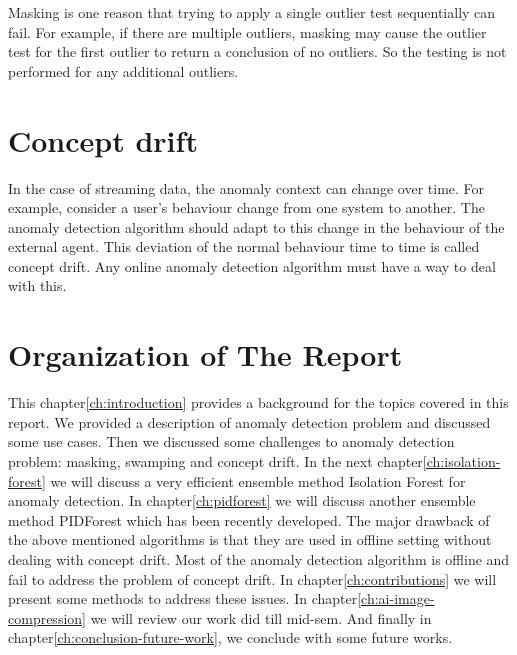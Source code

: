 Masking is one reason that trying to apply a single outlier test sequentially can fail.
For example, if there are multiple outliers, masking may cause the outlier test for the first outlier to return a conclusion of no outliers.
So the testing is not performed for any additional outliers.

\section{Concept drift}
\label{sec:concept-drift-definition}

In the case of streaming data, the anomaly context can change over time.
For example, consider a user's behaviour change from one system to another.
The anomaly detection algorithm should adapt to this change in the behaviour of the external agent.
This deviation of the normal behaviour time to time is called concept drift.
Any online anomaly detection algorithm must have a way to deal with this.


\section{Organization of The Report}
\label{sec:organization-of-the-report}

This chapter\ref{ch:introduction} provides a background for the topics covered in this report.
We provided a description of anomaly detection problem and discussed some use cases.
Then we discussed some challenges to anomaly detection problem: masking, swamping and concept drift.
In the next chapter\ref{ch:isolation-forest} we will discuss a very efficient ensemble method Isolation Forest for anomaly detection.
In chapter\ref{ch:pidforest} we will discuss another ensemble method PIDForest which has been recently developed.
The major drawback of the above mentioned algorithms is that they are used in offline setting without dealing with concept drift.
Most of the anomaly detection algorithm is offline and fail to address the problem of concept drift.
In chapter\ref{ch:contributions} we will present some methods to address these issues.
In chapter\ref{ch:ai-image-compression} we will review our work did till mid-sem.
And finally in chapter\ref{ch:conclusion-future-work}, we conclude with some future works.

